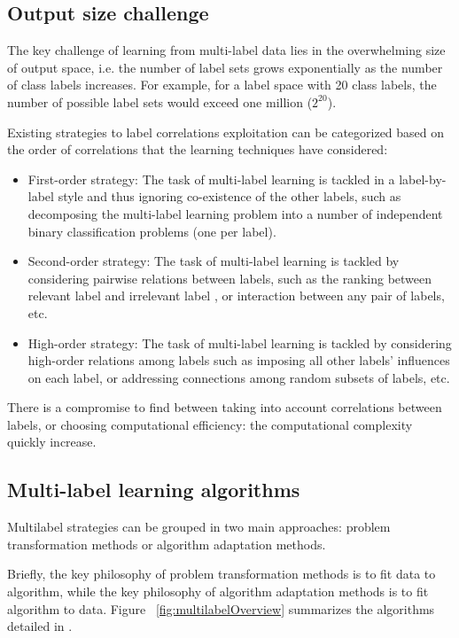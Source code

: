 \subsection{Output size challenge}

The key challenge of learning from multi-label data lies in the overwhelming size of output space, i.e. the number of label sets grows exponentially as the number of class labels increases. For example, for a label space with 20 class labels, the number of possible label sets would exceed one million ($2^{20}$).

Existing strategies to label correlations exploitation can be categorized based on the order of correlations that the learning techniques have considered:
\begin{itemize}
	\item First-order strategy: The task of multi-label learning is tackled in a label-by-label style and thus ignoring co-existence of the other labels, such as decomposing the multi-label learning problem into a number of independent binary classification problems (one per label). 
	\item Second-order strategy: The task of multi-label learning is tackled by considering pairwise relations between labels, such as the ranking between relevant label and irrelevant label , or interaction between any pair of labels, etc.
	\item High-order strategy: The task of multi-label learning is tackled by considering high-order relations among labels such as imposing all other labels’ influences on each label, or addressing connections among random subsets of labels, etc.
\end{itemize}

There is a compromise to find between taking into account correlations between labels, or choosing computational efficiency: the computational complexity quickly increase.

\subsection{Multi-label learning algorithms}

Multilabel strategies can be grouped in two main approaches: problem transformation methods or algorithm adaptation methods.

Briefly, the key philosophy of problem transformation methods is to fit data to algorithm,
while the key philosophy of algorithm adaptation methods is to fit algorithm to data. Figure ~\ref{fig:multilabelOverview}
summarizes the algorithms detailed in \cite[Zhang and Zhou paper]{MultilabelReview}.

